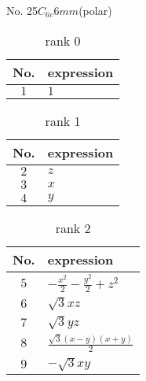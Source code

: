 \documentclass[fleqn,8pt,landscape]{jsarticle}
\begin{document}
\setcounter{MaxMatrixCols}{16}

\begin{center}
\LARGE
No. 25\quad$C_{6v}$\quad$6mm$\quad[ hexagonal ] (polar)
\end{center}
\begin{table}[ht!]
\begin{center}
\caption{rank 0}
\renewcommand{\arraystretch}{1.3}
\begin{tabular}{cl} \hline \hline
No. & expression \\ \hline
$ 1 $ & $ 1 $ \\
 \hline \hline
\end{tabular}
\end{center}
\end{table}
\begin{table}[ht!]
\begin{center}
\caption{rank 1}
\renewcommand{\arraystretch}{1.3}
\begin{tabular}{cl} \hline \hline
No. & expression \\ \hline
$ 2 $ & $ z $ \\
$ 3 $ & $ x $ \\
$ 4 $ & $ y $ \\
 \hline \hline
\end{tabular}
\end{center}
\end{table}
\begin{table}[ht!]
\begin{center}
\caption{rank 2}
\renewcommand{\arraystretch}{1.3}
\begin{tabular}{cl} \hline \hline
No. & expression \\ \hline
$ 5 $ & $ - \frac{x^{2}}{2} - \frac{y^{2}}{2} + z^{2} $ \\
$ 6 $ & $ \sqrt{3} x z $ \\
$ 7 $ & $ \sqrt{3} y z $ \\
$ 8 $ & $ \frac{\sqrt{3} \left(x - y\right) \left(x + y\right)}{2} $ \\
$ 9 $ & $ - \sqrt{3} x y $ \\
 \hline \hline
\end{tabular}
\end{center}
\end{table}
\end{document}
